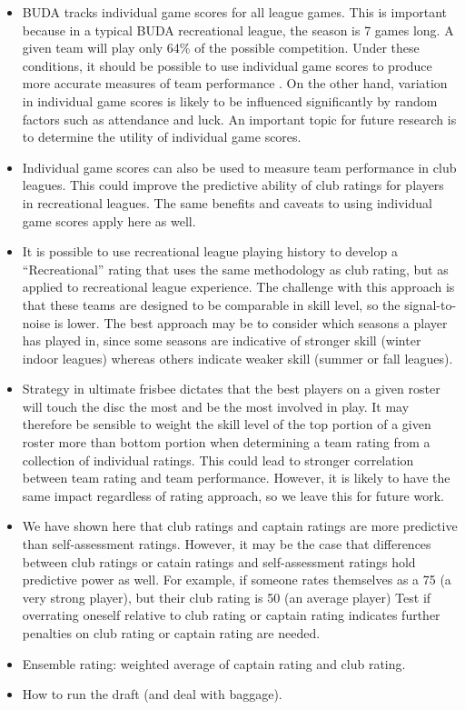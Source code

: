 \begin{itemize}

\item BUDA tracks individual game scores for all league games. This is important because in a typical BUDA recreational league, the season is 7 games long. A given team will play only 64\% of the possible competition. Under these conditions, it should be possible to use individual game scores to produce more accurate measures of team performance \cite{Langville_2012}. On the other hand, variation in individual game scores is likely to be influenced significantly by random factors such as attendance and luck. An important topic for future research is to determine the utility of individual game scores.

\item Individual game scores can also be used to measure team performance in club leagues. This could improve the predictive ability of club ratings for players in recreational leagues. The same benefits and caveats to using individual game scores apply here as well.

\item It is possible to use recreational league playing history to develop a ``Recreational'' rating that uses the same methodology as club rating, but as applied to recreational league experience. The challenge with this approach is that these teams are designed to be comparable in skill level, so the signal-to-noise is lower. The best approach may be to consider which seasons a player has played in, since some seasons are indicative of stronger skill (winter indoor leagues) whereas others indicate weaker skill (summer or fall leagues).

\item Strategy in ultimate frisbee dictates that the best players on a given roster will touch the disc the most and be the most involved in play.  It may therefore be sensible to weight the skill level of the top portion of a given roster more than bottom portion when determining a team rating from a collection of individual ratings. This could lead to stronger correlation between team rating and team performance. However, it is likely to have the same impact regardless of rating approach, so we leave this for future work.

\item We have shown here that club ratings and captain ratings are more predictive than self-assessment ratings. However, it may be the case that differences between club ratings or catain ratings and self-assessment ratings hold predictive power as well. For example, if someone rates themselves as a 75 (a very strong player), but their club rating is 50 (an average player) Test if overrating oneself relative to club rating or captain rating indicates further penalties on club rating or captain rating are needed.

\item Ensemble rating: weighted average of captain rating and club rating.

\item How to run the draft (and deal with baggage).

\end{itemize}